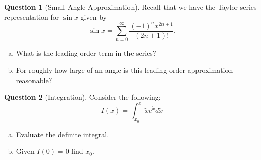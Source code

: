\documentclass[12pt]{article}
\theoremstyle{definition}
\newtheorem{question}{Question}
\begin{document}
\pagebreak





\begin{question}[Small Angle Approximation]
Recall that we have the Taylor series representation for $\sin x$ given by
\[
\sin x = \sum_{n=0}^\infty \frac{(-1)^n x^{2n+1}}{(2n+1)!}.
\]
\begin{enumerate}[(a)]
    \item What is the leading order term in the series?
    \item For roughly how large of an angle is this leading order approximation reasonable?
\end{enumerate}
\end{question}

\pagebreak




\begin{question}[Integration] Consider the following: 
\[
I(x)=\int_{x_0}^x \tilde{x} e^{\tilde{x}} d\tilde{x}
\]
\begin{enumerate}[(a)]
    \item Evaluate the definite integral.
    \item Given $I(0)=0$ find $x_0$. 
\end{enumerate}
\end{question}

\pagebreak
\end{document}

